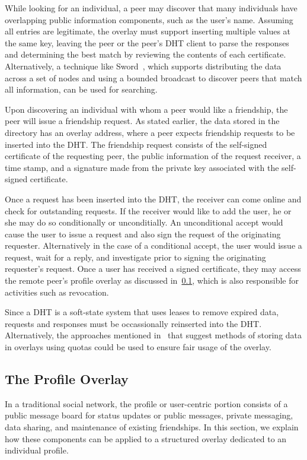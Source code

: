 \documentclass[letterpaper,twocolumn,10pt]{article}
\begin{document}
While looking for an individual, a peer may discover that many individuals have
overlapping public information components, such as the user's name.  Assuming
all entries are legitimate, the overlay must support inserting multiple values
at the same key, leaving the peer or the peer's DHT client to parse the
responses and determining the best match by reviewing the contents of each
certificate.  Alternatively, a technique like Sword~\cite{sword}, which supports
distributing the data across a set of nodes and using a bounded broadcast to
discover peers that match all information, can be used for searching.

Upon discovering an individual with whom a peer would like a friendship, the
peer will issue a friendship request.  As stated earlier, the data stored in
the directory has an overlay address, where a peer expects friendship requests
to be inserted into the DHT.  The friendship request consists of the self-signed
certificate of the requesting peer, the public information of the request
receiver, a time stamp, and a signature made from the private key associated with
the self-signed certificate.  

Once a request has been inserted into the DHT, the receiver can come online and
check for outstanding requests.  If the receiver would like to add the user, he or she
may do so conditionally or unconditially.  An unconditional accept would cause
the user to issue a request and also sign the request of the originating
requester.  Alternatively in the case of a conditional accept, the user would
issue a request, wait for a reply, and investigate prior to signing the originating
requester's request.  Once a user has received a signed certificate, they may access
the remote peer's profile overlay as discussed in~\ref{profile_overlay}, which is
also responsible for activities such as revocation.

Since a DHT is a soft-state system that uses leases to remove expired data, requests
and responses must be occassionally reinserted into the DHT.  Alternatively, the
approaches mentioned in~\cite{} that suggest methods of storing data in overlays
using quotas could be used to ensure fair usage of the overlay.

\subsection{The Profile Overlay}
\label{profile_overlay} In a traditional social network, the profile or
user-centric portion consists of a public message board for status updates or
public messages, private
messaging, data sharing, and maintenance of existing friendships.  In this
section, we explain how these components can be applied to a structured overlay
dedicated to an individual profile.
\end{document}
